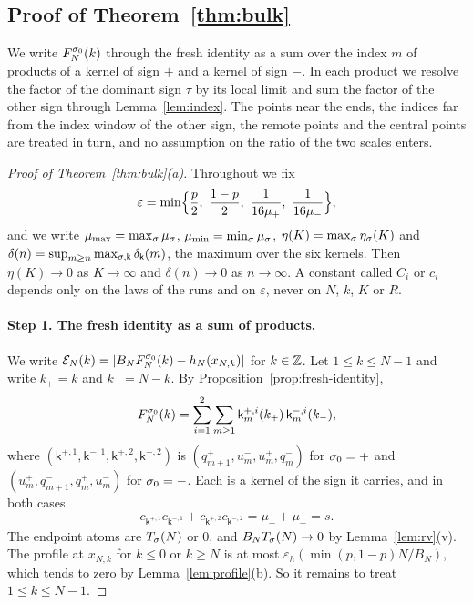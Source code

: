 \subsection{Proof of Theorem~\ref{thm:bulk}}\label{sec:bulk-proof}

We write $F^{\sigma_0}_N(k)$ through the fresh identity as a sum over the index $m$ of
products of a kernel of sign $\plus$ and a kernel of sign $\minus$. In each product
we resolve the factor of the dominant sign $\tau$ by its local limit and sum the
factor of the other sign through Lemma~\ref{lem:index}. The points near the ends, the
indices far from the index window of the other sign, the remote points and the central
points are treated in turn, and no assumption on the ratio of the two scales enters.

\begin{proof}[Proof of Theorem~\ref{thm:bulk}(a)]
Throughout we fix
\[
 \varepsilon=\min\Bigl\{\frac p2,\ \frac{1-p}2,\ \frac1{16\mu_\plus},\ \frac1{16\mu_\minus}\Bigr\},
\]
and we write $\mu_{\max}=\max_\sigma\mu_\sigma$, $\mu_{\min}=\min_\sigma\mu_\sigma$,
$\eta(K)=\max_\sigma\eta_\sigma(K)$ and $\delta(n)=\sup_{m\ge n}\max_{\sigma,\mathsf k}\delta_{\mathsf k}(m)$,
the maximum over the six kernels. Then $\eta(K)\to0$ as $K\to\infty$ and
$\delta(n)\to0$ as $n\to\infty$. A constant called $C_i$ or $c_i$ depends only on the
laws of the runs and on $\varepsilon$, never on $N$, $k$, $K$ or $R$.

\paragraph{Step 1. The fresh identity as a sum of products.}
We write $\mathcal E_N(k)=|B_NF^{\sigma_0}_N(k)-h_N(x_{N,k})|$ for $k\in\mathbb{Z}$. Let
$1\le k\le N-1$ and write $k_\plus=k$ and $k_\minus=N-k$. By
Proposition~\ref{prop:fresh-identity},
\begin{equation}\label{eq:bulk-pairs}
 F^{\sigma_0}_N(k)=\sum_{i=1}^2\sum_{m\ge1}\mathsf k^{{+},i}_m(k_{+})\,\mathsf k^{{-},i}_m(k_{-}),
\end{equation}
where $(\mathsf k^{\plus,1},\mathsf k^{\minus,1},\mathsf k^{\plus,2},\mathsf k^{\minus,2})$ is
$(q^\plus_{m+1},u^\minus_m,u^\plus_m,q^\minus_m)$ for $\sigma_0={+}$ and
$(u^\plus_m,q^\minus_{m+1},q^\plus_m,u^\minus_m)$ for $\sigma_0={-}$. Each is a kernel of
the sign it carries, and in both cases
\begin{equation}\label{eq:bulk-weights}
 c_{\mathsf k^{\plus,1}}c_{\mathsf k^{\minus,1}}+c_{\mathsf k^{\plus,2}}c_{\mathsf k^{\minus,2}}=\mu_\plus+\mu_\minus=s .
\end{equation}
The endpoint atoms are $T_\sigma(N)$ or $0$, and $B_NT_\sigma(N)\to0$ by
Lemma~\ref{lem:rv}(v). The profile at $x_{N,k}$ for $k\le0$ or $k\ge N$ is at most
$\varepsilon_h(\min(p,1-p)N/B_N)$, which tends to zero by Lemma~\ref{lem:profile}(b).
So it remains to treat $1\le k\le N-1$.


\end{proof}
